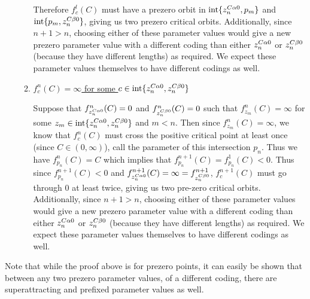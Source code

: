 \begin{myproof}
\begin{enumerate}
\begin{enumerate}
			Therefore $f^l_c (C)$ must have a prezero orbit in $\text{int}\{z_n^{C\alpha 0},p_m\}$ and $\text{int}\{p_m,z_n^{C\beta 0}\}$,  giving us two prezero critical orbits. Additionally, since $n + 1 > n$, choosing either of these parameter values would give a new prezero parameter value with a different coding than either $z_n^{C\alpha 0}$ or $z_n^{C\beta 0}$ (because they have different lengths) as required. We expect these parameter values themselves to have different codings as well.

		\item \underline{$f^n_c(C) = \infty$ for some $c \in \text{int}\{z_n^{C\alpha 0},z_n^{C\beta 0}\}$}

			Suppose that $f^{n}_{z_n^{C\alpha 0}} (C)= 0$ and $f^{n}_{z_n^{C\beta 0}} (C) = 0$ such that $f^n_{z_m} (C) = \infty$ for some $z_m \in \text{int}\{z_n^{C\alpha 0},z_n^{C\beta 0}\}$ and $m < n$. Then since $f^n_{z_m} (C) =  \infty$, we know that $f^n_{c} (C)$ must cross the positive critical point at least once (since $C \in (0, \infty)$), call the parameter of this intersection $p_n$. Thus we have $f^n_{p_n} (C) = C$ which implies that $f^{n + 1}_{p_n} (C) = f^{1}_{p_n} (C) < 0$. Thus since $f^{n + 1}_{p_n} (C) < 0 $ and $f^{n + 1}_{z_n^{C\alpha 0}} (C) = \infty = f^{n + 1}_{z_n^{C\beta 0}}$, $f^{n+1}_c (C)$ must go through 0 at least twice, giving us two pre-zero critical orbits. Additionally, since $n + 1 > n$, choosing either of these parameter values would give a new prezero parameter value with a different coding than either $z_n^{C\alpha 0}$ or $z_n^{C\beta 0}$ (because they have different lengths) as required. We expect these parameter values themselves to have different codings as well.

			\end{enumerate}

		\end{enumerate}
		\end{myproof}

		Note that while the proof above is for prezero points, it can easily be shown that between any two prezero parameter values, of a different coding, there are superattracting and prefixed parameter values as well.





